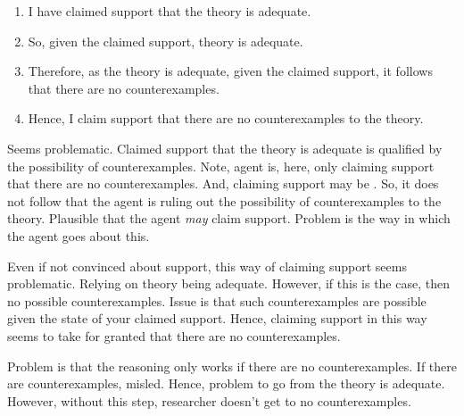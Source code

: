 \begin{note}
\begin{illustration}
    \begin{enumerate}
    \item I have claimed support that the theory is adequate.
    \item So, given the claimed support, theory is adequate.
    \item Therefore, as the theory is adequate, given the claimed support, it follows that there are no counterexamples.
    \item Hence, I claim support that there are no counterexamples to the theory.
    \end{enumerate}
    \vspace{-\baselineskip}
  \end{illustration}
\end{note}

\begin{note}
  Seems problematic.
  Claimed support that the theory is adequate is qualified by the possibility of counterexamples.
  {
    \color{red}
    Note, agent is, here, only claiming support that there are no counterexamples.
    And, claiming support may be \mom{}.
    So, it does not follow that the agent is ruling out the possibility of counterexamples to the theory.
    Plausible that the agent \emph{may} claim support.
    Problem is the way in which the agent goes about this.
  }

  {
    Even if not convinced about support, this way of claiming support seems problematic.
    Relying on theory being adequate.
    However, if this is the case, then no possible counterexamples.
    Issue is that such counterexamples are possible given the state of your claimed support.
    Hence, claiming support in this way seems to take for granted that there are no counterexamples.
  }

  Problem is that the reasoning only works if there are no counterexamples.
  If there are counterexamples, misled.
  Hence, problem to go from the theory is adequate.
  However, without this step, researcher doesn't get to no counterexamples.
\end{note}

